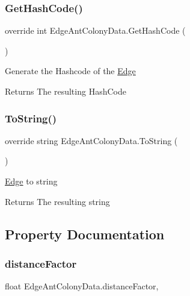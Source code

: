 \subsubsection{\texorpdfstring{Get\+Hash\+Code()}{GetHashCode()}}
{\footnotesize\ttfamily override int Edge\+Ant\+Colony\+Data.\+Get\+Hash\+Code (\begin{DoxyParamCaption}{ }\end{DoxyParamCaption})\hspace{0.3cm}{\ttfamily [inline]}}



Generate the Hashcode of the \hyperlink{classEdge}{Edge} 

\begin{DoxyReturn}{Returns}
The resulting Hash\+Code
\end{DoxyReturn}
\mbox{\label{classEdgeAntColonyData_a96fcbfc9f8617fbe61e23fce620db096}} 
\subsubsection{\texorpdfstring{To\+String()}{ToString()}}
{\footnotesize\ttfamily override string Edge\+Ant\+Colony\+Data.\+To\+String (\begin{DoxyParamCaption}{ }\end{DoxyParamCaption})}



\hyperlink{classEdge}{Edge} to string 

\begin{DoxyReturn}{Returns}
The resulting string
\end{DoxyReturn}


\subsection{Property Documentation}
\mbox{\label{classEdgeAntColonyData_a59a62ff81819e2be030da38ca02bb059}} 
\subsubsection{\texorpdfstring{distance\+Factor}{distanceFactor}}
{\footnotesize\ttfamily float Edge\+Ant\+Colony\+Data.\+distance\+Factor\hspace{0.3cm}{\ttfamily [get]}, {\ttfamily [set]}}



